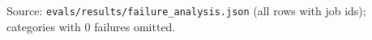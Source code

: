 Source: \texttt{evals/results/failure\_analysis.json} (all rows with job ids); categories with 0 failures omitted.
